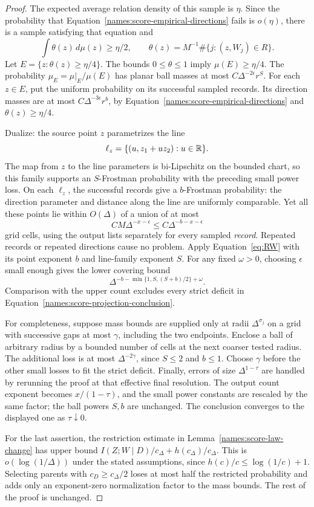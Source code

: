 \begin{proof}
The expected average relation density of this sample is $\eta$.
Since the probability that
Equation~\eqref{names:score-empirical-directions} fails is $o(\eta)$,
there is a sample satisfying that equation and
\[
 \int\theta(z)\,d\mu(z)\ge\eta/2,
 \qquad
 \theta(z)=M^{-1}\#\{j:(z,W_j)\in R\}.
\]
Let $E=\{z:\theta(z)\ge\eta/4\}$.  The bounds $0\le\theta\le1$
imply $\mu(E)\ge\eta/4$.  The probability
$\mu_E=\mu|_E/\mu(E)$ has planar ball masses at most
$C\Delta^{-2\epsilon}r^S$.  For each $z\in E$, put the uniform
probability on its successful sampled records.  Its direction masses
are at most $C\Delta^{-3\epsilon}r^b$, by
Equation~\eqref{names:score-empirical-directions} and
$\theta(z)\ge\eta/4$.

Dualize: the source point $z$ parametrizes the line
\[
 \ell_z=\{(u,z_1+uz_2):u\in\mathbb R\}.
\]
The map from $z$ to the line parameters is bi-Lipschitz on the bounded
chart, so this family supports an $S$-Frostman probability with the
preceding small power loss.  On each $\ell_z$, the successful records
give a $b$-Frostman probability: the direction parameter and distance
along the line are uniformly comparable.  Yet all these points lie
within $O(\Delta)$ of a union of at most
\[
 C M\Delta^{-x-\epsilon}
    \le C\Delta^{-b-x-\epsilon}
\]
grid cells, using the output lists separately for every sampled
\emph{record}.  Repeated records or repeated directions cause no
problem.  Apply Equation~\eqref{eq:RW} with its point exponent $b$
and line-family exponent $S$.  For any fixed $\omega>0$, choosing
$\epsilon$ small enough gives the lower covering bound
\[
 \Delta^{-b-\min\{1,S,(S+b)/2\}+\omega}.
\]
Comparison with the upper count excludes every strict deficit in
Equation~\eqref{names:score-projection-conclusion}.

For completeness, suppose mass bounds are supplied only at radii
$\Delta^{\sigma_j}$ on a grid with successive gaps at most $\gamma$,
including the two endpoints.  Enclose a ball of arbitrary radius by a
bounded number of cells at the next coarser tested radius.  The
additional loss is at most $\Delta^{-2\gamma}$, since $S\le2$ and
$b\le1$.  Choose $\gamma$ before the other small losses to fit the
strict deficit.  Finally, errors of size $\Delta^{1-\tau}$ are handled
by rerunning the proof at that effective final resolution.  The output
count exponent becomes $x/(1-\tau)$, and the small power constants are
rescaled by the same factor; the ball powers $S,b$ are unchanged.  The
conclusion converges to the displayed one as $\tau\downarrow0$.

For the last assertion, the restriction estimate in
Lemma~\ref{names:score-law-change} has upper bound
$I(Z;W\mid D)/c_\Delta+h(c_\Delta)/c_\Delta$.  This is
$o(\log(1/\Delta))$ under the stated assumptions, since
$h(c)/c\le\log(1/c)+1$.  Selecting parents with
$c_D\ge c_\Delta/2$ loses at most half the restricted probability and
adds only an exponent-zero normalization factor to the mass bounds.
The rest of the proof is unchanged.
\end{proof}

